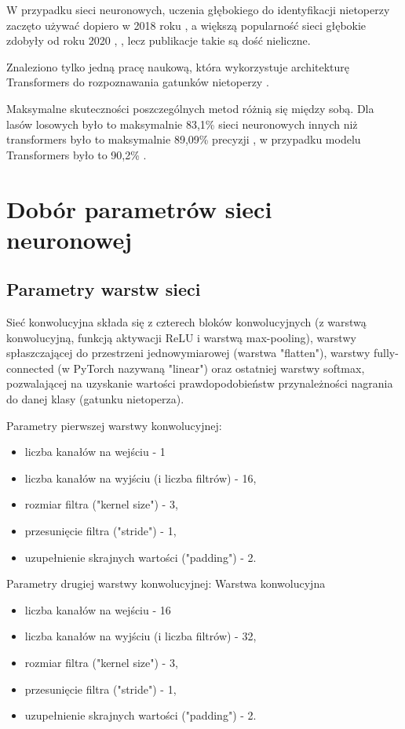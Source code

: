 \documentclass{sprz}
\begin{document}
W przypadku sieci neuronowych, uczenia głębokiego do identyfikacji nietoperzy zaczęto używać dopiero w 2018 roku \cite{bats-id-dl2018}, a większą popularność sieci głębokie zdobyły od roku 2020 \cite{bats-id-dl2020a}, \cite{bats-id-dl2020b}, lecz publikacje takie są dość nieliczne.

Znaleziono tylko jedną pracę naukową, która wykorzystuje architekturę Transformers do rozpoznawania gatunków nietoperzy \cite{bats-transformers}.

Maksymalne skuteczności poszczególnych metod różnią się między sobą. Dla lasów losowych było to maksymalnie 83,1\% \cite{bats-id-randomforest} sieci neuronowych innych niż transformers było to maksymalnie 89,09\% precyzji \cite{bats-id-dl}, w przypadku modelu Transformers było to 90,2\% \cite{bats-transformers}.

\section{Dobór parametrów sieci neuronowej}

\subsection{Parametry warstw sieci}
Sieć konwolucyjna składa się z czterech bloków konwolucyjnych (z warstwą konwolucyjną, funkcją aktywacji ReLU i warstwą max-pooling), warstwy spłaszczającej do przestrzeni jednowymiarowej (warstwa "flatten"), warstwy fully-connected (w PyTorch nazywaną "linear") oraz ostatniej warstwy softmax, pozwalającej na uzyskanie wartości prawdopodobieństw przynależności nagrania do danej klasy (gatunku nietoperza).

Parametry pierwszej warstwy konwolucyjnej:
\begin{itemize}
  \item{liczba kanałów na wejściu - 1}
  \item{liczba kanałów na wyjściu (i liczba filtrów) - 16,}
  \item{rozmiar filtra ("kernel size") - 3,}
  \item {przesunięcie filtra ("stride") - 1,}
  \item{uzupełnienie skrajnych wartości ("padding") - 2.}
\end{itemize}


Parametry drugiej warstwy konwolucyjnej:
Warstwa konwolucyjna
\begin{itemize}
  \item{liczba kanałów na wejściu - 16}
  \item{liczba kanałów na wyjściu (i liczba filtrów) - 32,}
  \item{rozmiar filtra ("kernel size") - 3,}
  \item {przesunięcie filtra ("stride") - 1,}
  \item{uzupełnienie skrajnych wartości ("padding") - 2.}
\end{itemize}
\end{document}
